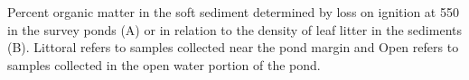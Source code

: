 \label{fig:LOI_survey}
Percent organic matter in the soft sediment determined by loss on ignition at 550 in the survey ponds (A) or in relation to the density of leaf litter in the sediments (B).  Littoral refers to samples collected near the pond margin and Open refers to samples collected in the open water portion of the pond.